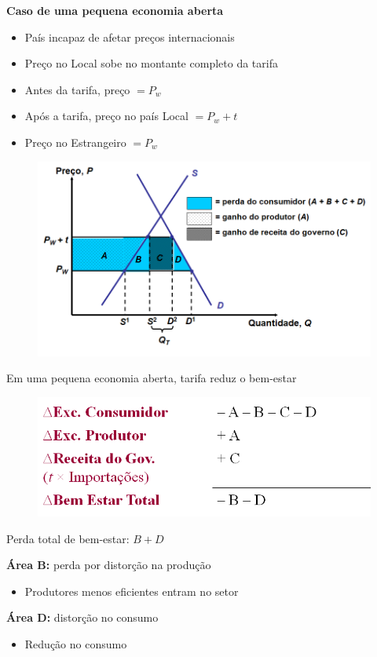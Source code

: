 \documentclass[a4paper,12pt]{article}[abntex2]
\begin{document}
\textbf{Caso de uma pequena economia aberta}
\begin{itemize}
  \item País incapaz de afetar preços internacionais
  \item Preço no Local sobe no montante completo da tarifa
  \item Antes da tarifa, preço $= P_w$
  \item Após a tarifa, preço no país Local $= P_w + t$
  \item Preço no Estrangeiro $= P_w$
\end{itemize}

\begin{figure}[H]
    \centering
    \includegraphics[width=0.75\linewidth]{Imagens/a20i5.png}
\end{figure}

Em uma pequena economia aberta, tarifa reduz o bem-estar

\begin{figure}[H]
    \centering
    \includegraphics[width=0.75\linewidth]{Imagens/a20i6.png}
\end{figure}

Perda total de bem-estar: \(B + D\)

\textbf{Área B:} perda por distorção na produção\begin{itemize}
    \item Produtores menos eficientes entram no setor
\end{itemize}

\textbf{Área D:} distorção no consumo\begin{itemize}
    \item Redução no consumo
\end{itemize}
\end{document}
